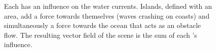 \begin{figure}
\caption{Each  has an influence on the water currents. Islands, defined with an area, add a force towards themselves (waves crashing on coasts) and simultaneously a force towards the ocean that acts as an obstacle flow. The resulting vector field of the scene is the sum of each 's influence.}
\label{fig:env-obj-island-flowfield}
\end{figure}



